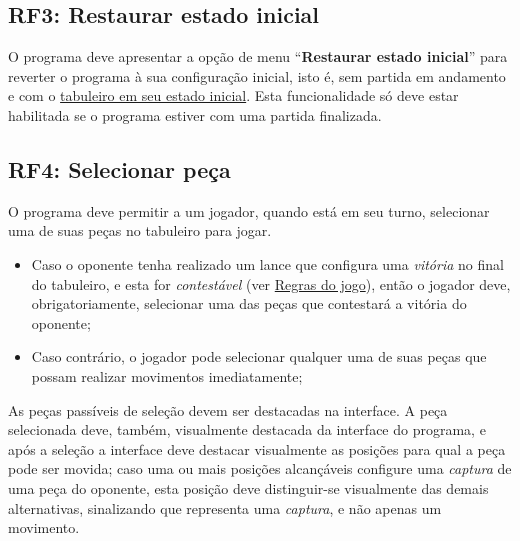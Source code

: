 \subsection{RF3: Restaurar estado inicial}\label{subsection:RF3}
O programa deve apresentar a opção de menu ``\textbf{Restaurar estado inicial}'' para reverter o programa à sua
configuração inicial, isto é, sem partida em andamento e com o \hyperref[fig:configuracao tabuleiro]{tabuleiro em seu
estado inicial}. Esta funcionalidade só deve estar habilitada se o programa estiver com uma partida finalizada.

\subsection{RF4: Selecionar peça}\label{subsection:RF4}
O programa deve permitir a um jogador, quando está em seu turno, selecionar uma de suas peças no tabuleiro para jogar.
\begin{itemize}
  \item Caso o oponente tenha realizado um lance que configura uma \textit{vitória} no final do tabuleiro, e esta for
    \textit{contestável} (ver \hyperref[section:regras]{Regras do jogo}), então o jogador deve, obrigatoriamente,
    selecionar uma das peças que contestará a vitória do oponente;
  \item Caso contrário, o jogador pode selecionar qualquer uma de suas peças que possam realizar movimentos
    imediatamente;
\end{itemize}
As peças passíveis de seleção devem ser destacadas na interface. A peça selecionada deve, também, visualmente destacada
da interface do programa, e após a seleção a interface deve destacar visualmente as posições para qual a peça pode ser
movida; caso uma ou mais posições alcançáveis configure uma \textit{captura} de uma peça do oponente, esta posição
deve distinguir-se visualmente das demais alternativas, sinalizando que representa uma \textit{captura}, e não apenas um
movimento.

